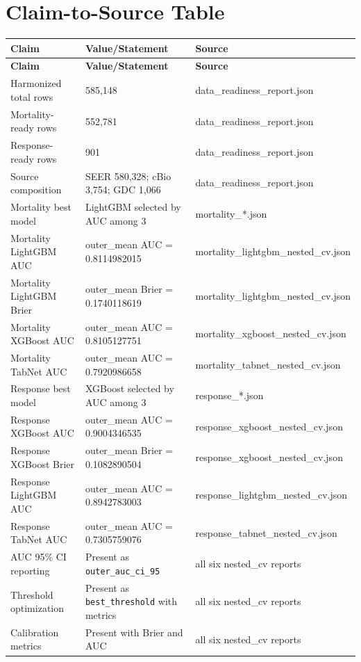 \documentclass[journal]{IEEEtran}
\begin{document}
\section{Claim-to-Source Table}
\renewcommand{\arraystretch}{1.08}
\begin{longtable}{p{}p{}p{}}
\toprule
\textbf{Claim} & \textbf{Value/Statement} & \textbf{Source} \\
\midrule
\endfirsthead
\toprule
\textbf{Claim} & \textbf{Value/Statement} & \textbf{Source} \\
\midrule
\endhead

Harmonized total rows & 585,148 & data\_readiness\_report.json \\
Mortality-ready rows & 552,781 & data\_readiness\_report.json \\
Response-ready rows & 901 & data\_readiness\_report.json \\
Source composition & SEER 580,328; cBio 3,754; GDC 1,066 & data\_readiness\_report.json \\

Mortality best model & LightGBM selected by AUC among 3 & mortality\_*.json \\
Mortality LightGBM AUC & outer\_mean AUC = 0.8114982015 & mortality\_lightgbm\_nested\_cv.json \\
Mortality LightGBM Brier & outer\_mean Brier = 0.1740118619 & mortality\_lightgbm\_nested\_cv.json \\
Mortality XGBoost AUC & outer\_mean AUC = 0.8105127751 & mortality\_xgboost\_nested\_cv.json \\
Mortality TabNet AUC & outer\_mean AUC = 0.7920986658 & mortality\_tabnet\_nested\_cv.json \\

Response best model & XGBoost selected by AUC among 3 & response\_*.json \\
Response XGBoost AUC & outer\_mean AUC = 0.9004346535 & response\_xgboost\_nested\_cv.json \\
Response XGBoost Brier & outer\_mean Brier = 0.1082890504 & response\_xgboost\_nested\_cv.json \\
Response LightGBM AUC & outer\_mean AUC = 0.8942783003 & response\_lightgbm\_nested\_cv.json \\
Response TabNet AUC & outer\_mean AUC = 0.7305759076 & response\_tabnet\_nested\_cv.json \\

AUC 95\% CI reporting & Present as \texttt{outer\_auc\_ci\_95} & all six nested\_cv reports \\
Threshold optimization & Present as \texttt{best\_threshold} with metrics & all six nested\_cv reports \\
Calibration metrics & Present with Brier and AUC & all six nested\_cv reports \\


\end{longtable}
\end{document}
